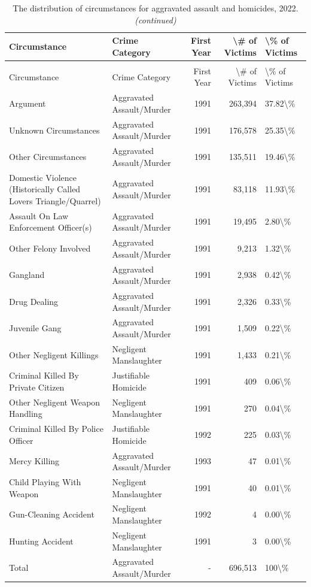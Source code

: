 \documentclass[
]{krantz}
\begin{document}
\begin{longtable}[t]{l|l|r|r|l}
\caption{\label{tab:victimAggAssault}The distribution of circumstances for aggravated assault and homicides, 2022.}\\
\hline
Circumstance & Crime Category & First Year & \textbackslash{}\# of Victims & \textbackslash{}\% of Victims\\
\hline
\endfirsthead
\caption[]{\label{tab:victimAggAssault}The distribution of circumstances for aggravated assault and homicides, 2022. \textit{(continued)}}\\
\hline
Circumstance & Crime Category & First Year & \textbackslash{}\# of Victims & \textbackslash{}\% of Victims\\
\hline
\endhead
Argument & Aggravated Assault/Murder & 1991 & 263,394 & 37.82\textbackslash{}\%\\
\hline
Unknown Circumstances & Aggravated Assault/Murder & 1991 & 176,578 & 25.35\textbackslash{}\%\\
\hline
Other Circumstances & Aggravated Assault/Murder & 1991 & 135,511 & 19.46\textbackslash{}\%\\
\hline
Domestic Violence (Historically Called Lovers Triangle/Quarrel) & Aggravated Assault/Murder & 1991 & 83,118 & 11.93\textbackslash{}\%\\
\hline
Assault On Law Enforcement Officer(s) & Aggravated Assault/Murder & 1991 & 19,495 & 2.80\textbackslash{}\%\\
\hline
Other Felony Involved & Aggravated Assault/Murder & 1991 & 9,213 & 1.32\textbackslash{}\%\\
\hline
Gangland & Aggravated Assault/Murder & 1991 & 2,938 & 0.42\textbackslash{}\%\\
\hline
Drug Dealing & Aggravated Assault/Murder & 1991 & 2,326 & 0.33\textbackslash{}\%\\
\hline
Juvenile Gang & Aggravated Assault/Murder & 1991 & 1,509 & 0.22\textbackslash{}\%\\
\hline
Other Negligent Killings & Negligent Manslaughter & 1991 & 1,433 & 0.21\textbackslash{}\%\\
\hline
Criminal Killed By Private Citizen & Justifiable Homicide & 1991 & 409 & 0.06\textbackslash{}\%\\
\hline
Other Negligent Weapon Handling & Negligent Manslaughter & 1991 & 270 & 0.04\textbackslash{}\%\\
\hline
Criminal Killed By Police Officer & Justifiable Homicide & 1992 & 225 & 0.03\textbackslash{}\%\\
\hline
Mercy Killing & Aggravated Assault/Murder & 1993 & 47 & 0.01\textbackslash{}\%\\
\hline
Child Playing With Weapon & Negligent Manslaughter & 1991 & 40 & 0.01\textbackslash{}\%\\
\hline
Gun-Cleaning Accident & Negligent Manslaughter & 1992 & 4 & 0.00\textbackslash{}\%\\
\hline
Hunting Accident & Negligent Manslaughter & 1991 & 3 & 0.00\textbackslash{}\%\\
\hline
Total & Aggravated Assault/Murder & - & 696,513 & 100\textbackslash{}\%\\
\hline
\end{longtable}
\end{document}

